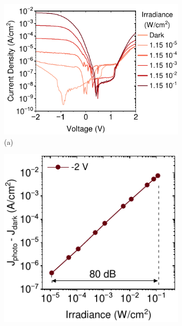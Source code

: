 \begin{figure}[htbp]
    \centering
    \begin{subfigure}[t]{0.39\textwidth}
        \centering
        \includegraphics[width=\textwidth]{chapters/transport_layers/images/JV_f_illumination.pdf} %
        \caption*{(a)}
    \end{subfigure}
    \hfill
    \begin{subfigure}[t]{0.29\textwidth}
        \centering
        \includegraphics[width=\textwidth]{chapters/transport_layers/images/linearity.pdf} %

\end{subfigure}
\end{figure}
